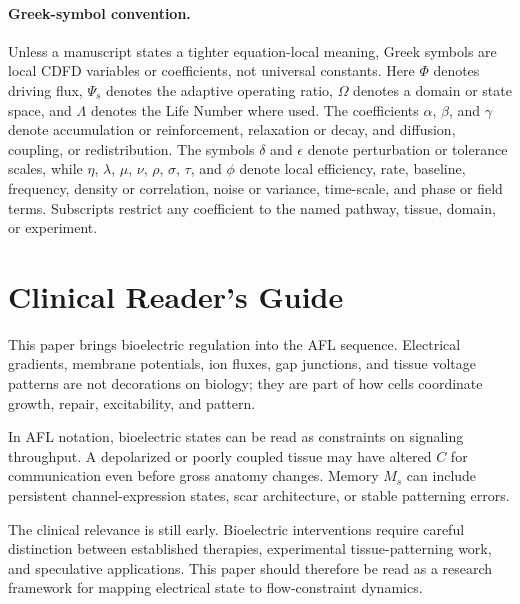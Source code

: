 \documentclass[12pt,a4paper]{article}
\begin{document}
\paragraph{Greek-symbol convention.}
Unless a manuscript states a tighter equation-local meaning, Greek symbols are local CDFD variables or coefficients, not universal constants. Here $\Phi$ denotes driving flux, $\Psi_s$ denotes the adaptive operating ratio, $\Omega$ denotes a domain or state space, and $\Lambda$ denotes the Life Number where used. The coefficients $\alpha$, $\beta$, and $\gamma$ denote accumulation or reinforcement, relaxation or decay, and diffusion, coupling, or redistribution. The symbols $\delta$ and $\epsilon$ denote perturbation or tolerance scales, while $\eta$, $\lambda$, $\mu$, $\nu$, $\rho$, $\sigma$, $\tau$, and $\phi$ denote local efficiency, rate, baseline, frequency, density or correlation, noise or variance, time-scale, and phase or field terms. Subscripts restrict any coefficient to the named pathway, tissue, domain, or experiment.

\section*{Clinical Reader's Guide}
This paper brings bioelectric regulation into the AFL sequence. Electrical gradients, membrane potentials, ion fluxes, gap junctions, and tissue voltage patterns are not decorations on biology; they are part of how cells coordinate growth, repair, excitability, and pattern.

In AFL notation, bioelectric states can be read as constraints on signaling throughput. A depolarized or poorly coupled tissue may have altered $C$ for communication even before gross anatomy changes. Memory $M_s$ can include persistent channel-expression states, scar architecture, or stable patterning errors.

The clinical relevance is still early. Bioelectric interventions require careful distinction between established therapies, experimental tissue-patterning work, and speculative applications. This paper should therefore be read as a research framework for mapping electrical state to flow-constraint dynamics.


\vspace{0.5em}\noindent{}
\vspace{0.75em}
\end{document}
